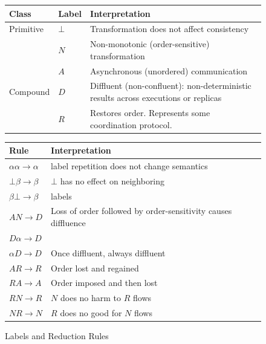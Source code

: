 \begin{figure}[t]
\begin{minipage}{.63\textwidth}
\footnotesize

\begin{tabular}{|l|l|p{7cm}|}
\hline
Class & Label & Interpretation \\ \hline
Primitive & $\bot$ & Transformation does not affect consistency \\ \cline{2-3}
& $N$ & Non-monotonic (order-sensitive) transformation \\ \cline{2-3}
& $A$ & Asynchronous (unordered) communication \\ \hline
Compound & $D$ & Diffluent (non-confluent): non-deterministic results across executions or replicas \\ \cline{2-3}
& $R$ & Restores order.  Represents some coordination protocol. \\ \hline

\end{tabular}




\end{minipage}
\begin{minipage}{.35\textwidth}
\raggedleft

\footnotesize
\begin{tabular}{|l|p{4cm}|}
\hline
Rule & Interpretation \\ \hline
$\alpha\alpha \rightarrow \alpha$ & label repetition does not change semantics \\ \hline
$\bot \beta \rightarrow \beta$ & $\bot$ has no effect on neighboring \\
$\beta \bot \rightarrow \beta$ & labels\\ \hline
$AN \rightarrow D$ & Loss of order followed by order-sensitivity causes diffluence \\ \hline
$D \alpha \rightarrow D$ & \\
$\alpha D \rightarrow D$ & Once diffluent, always diffluent\\ \hline
$AR \rightarrow R$ & Order lost and regained \\ \hline
$RA \rightarrow A$ & Order imposed and then lost \\ \hline
$RN \rightarrow R$ & $N$ does no harm to $R$ flows \\ \hline
$NR \rightarrow N$ & $R$ does no good for $N$ flows \\ \hline

\end{tabular}
\end{minipage}
\caption{Labels and Reduction Rules }
\label{fig:rules}
\end{figure}

